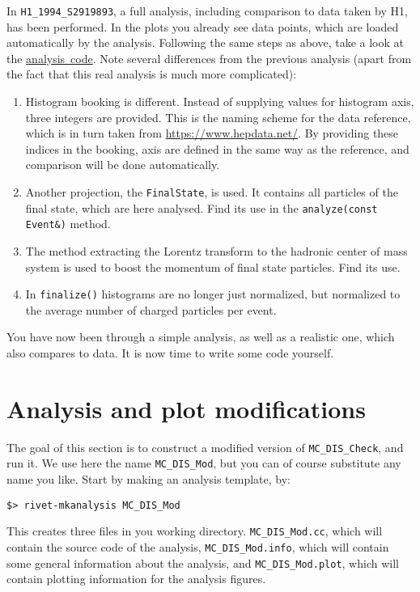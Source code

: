 \documentclass[11pt]{article}
\begin{document}
In \texttt{H1\_1994\_S2919893}, a full analysis, including comparison to data taken by H1, has been performed. In the plots you already see data points, which are loaded automatically by the analysis. Following the same steps as above, take a look at the {\href{https://rivet.hepforge.org/analyses/H1_1994_S2919893.html}{analysis~code}}. Note several differences from the previous analysis (apart from the fact that this real analysis is much more complicated):
\begin{enumerate}
	\item Histogram booking is different. Instead of supplying values for histogram axis, three integers are provided. This is the naming scheme for the data reference, which is in turn taken from \href{HEPData}{https://www.hepdata.net/}. By providing these indices in the booking, axis are defined in the same way as the reference, and comparison will be done automatically.
	\item Another projection, the \texttt{FinalState}, is used. It contains all particles of the final state, which are here analysed. Find its use in the \texttt{analyze(const Event\&)} method.
	\item The method extracting the Lorentz transform to the hadronic center of mass system is used to boost the momentum of final state particles. Find its use.
	\item In \texttt{finalize()} histograms are no longer just normalized, but normalized to the average number of charged particles per event.
\end{enumerate}

You have now been through a simple analysis, as well as a realistic one, which also compares to data. It is now time to write some code yourself.

\section{Analysis and plot modifications}
\label{sec:anamod}
The goal of this section is to construct a modified version of \texttt{MC\_DIS\_Check}, and run it. We use here the name \texttt{MC\_DIS\_Mod}, but you can of course substitute any name you like. Start by making an analysis template, by:
\begin{verbatim}
$> rivet-mkanalysis MC_DIS_Mod
\end{verbatim}
This creates three files in you working directory. \texttt{MC\_DIS\_Mod.cc}, which will contain the source code of the analysis, \texttt{MC\_DIS\_Mod.info}, which will contain some general information about the analysis, and \texttt{MC\_DIS\_Mod.plot}, which will contain plotting information for the analysis figures.
\end{document}
